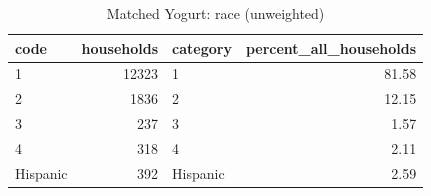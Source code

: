 \begin{table}
\caption{Matched Yogurt: race (unweighted)}
\begin{tabular}{lrlr}
\toprule
code & households & category & percent\_all\_households \\
\midrule
1 & 12323 & 1 & 81.58 \\
2 & 1836 & 2 & 12.15 \\
3 & 237 & 3 & 1.57 \\
4 & 318 & 4 & 2.11 \\
Hispanic & 392 & Hispanic & 2.59 \\
\bottomrule
\end{tabular}
\end{table}
